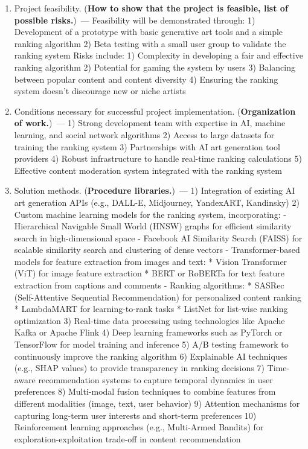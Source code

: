 \documentclass[12pt]{article}
\begin{document}
\begin{enumerate}
\item Project feasibility. (\textbf{How to show that the project is feasible, list of possible risks.})~--- 
Feasibility will be demonstrated through:
1) Development of a prototype with basic generative art tools and a simple ranking algorithm
2) Beta testing with a small user group to validate the ranking system
Risks include:
1) Complexity in developing a fair and effective ranking algorithm
2) Potential for gaming the system by users
3) Balancing between popular content and content diversity
4) Ensuring the ranking system doesn't discourage new or niche artists

\item Conditions necessary for successful project implementation. (\textbf{Organization of work.})~--- 
1) Strong development team with expertise in AI, machine learning, and social network algorithms
2) Access to large datasets for training the ranking system
3) Partnerships with AI art generation tool providers
4) Robust infrastructure to handle real-time ranking calculations
5) Effective content moderation system integrated with the ranking system

\item Solution methods. (\textbf{Procedure libraries.})~--- 
1) Integration of existing AI art generation APIs (e.g., DALL-E, Midjourney, YandexART, Kandinsky)
2) Custom machine learning models for the ranking system, incorporating:
   - Hierarchical Navigable Small World (HNSW) graphs for efficient similarity search in high-dimensional space
   - Facebook AI Similarity Search (FAISS) for scalable similarity search and clustering of dense vectors
   - Transformer-based models for feature extraction from images and text:
     * Vision Transformer (ViT) for image feature extraction
     * BERT or RoBERTa for text feature extraction from captions and comments
   - Ranking algorithms:
     * SASRec (Self-Attentive Sequential Recommendation) for personalized content ranking
     * LambdaMART for learning-to-rank tasks
     * ListNet for list-wise ranking optimization
3) Real-time data processing using technologies like Apache Kafka or Apache Flink
4) Deep learning frameworks such as PyTorch or TensorFlow for model training and inference
5) A/B testing framework to continuously improve the ranking algorithm
6) Explainable AI techniques (e.g., SHAP values) to provide transparency in ranking decisions
7) Time-aware recommendation systems to capture temporal dynamics in user preferences
8) Multi-modal fusion techniques to combine features from different modalities (image, text, user behavior)
9) Attention mechanisms for capturing long-term user interests and short-term preferences
10) Reinforcement learning approaches (e.g., Multi-Armed Bandits) for exploration-exploitation trade-off in content recommendation
\end{enumerate}
\end{document}
